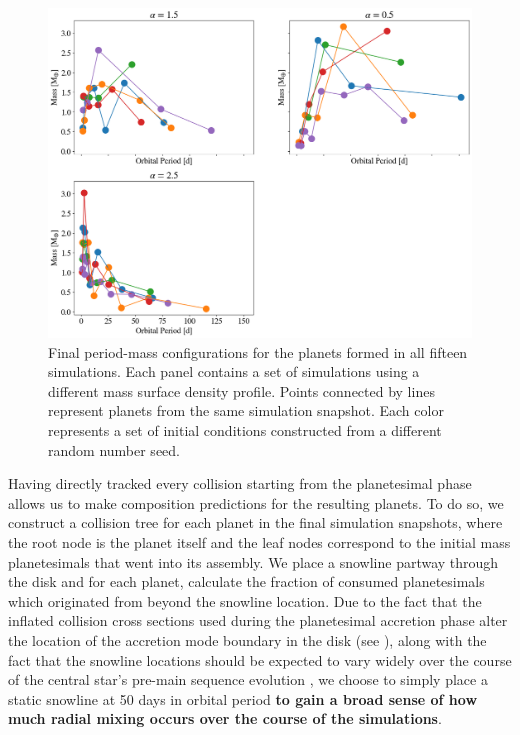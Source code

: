 \begin{figure}
\begin{center}
    \includegraphics[width=\textwidth]{figures/stip/per_mass_full.png}
    \caption{Final period-mass configurations for the planets formed in all fifteen simulations. Each panel contains a set of simulations using a different mass surface density profile. Points connected by lines represent planets from the same simulation snapshot. Each color represents a set of initial conditions constructed from a different random number seed.\label{fig:per_mass_full}}
\end{center}
\end{figure}


Having directly tracked every collision starting from the planetesimal phase allows us to make composition predictions for the resulting planets. To do so, we construct a collision tree for each planet in the final simulation snapshots, where the root node is the planet itself and the leaf nodes correspond to the initial mass planetesimals that went into its assembly. We place a snowline partway through the disk and for each planet, calculate the fraction of consumed planetesimals which originated from beyond the snowline location. Due to the fact that the inflated collision cross sections used during the planetesimal accretion phase alter the location of the accretion mode boundary in the disk (see \cite{wallace23}), along with the fact that the snowline locations should be expected to vary widely over the course of the central star's pre-main sequence evolution \cite{baraffe15}, we choose to simply place a static snowline at 50 days in orbital period \textbf{to gain a broad sense of how much radial mixing occurs over the course of the simulations}.


